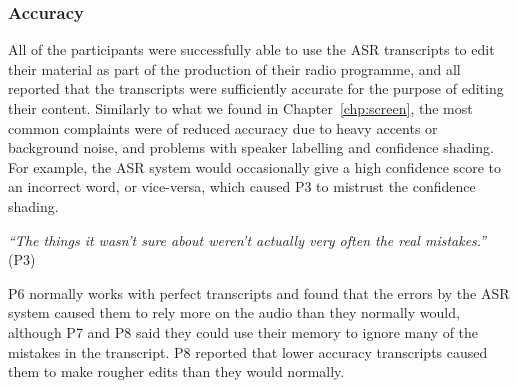 \subsubsection{Accuracy}

All of the participants were successfully able to use the ASR transcripts to edit their material as
part of the production of their radio programme, and all reported that the transcripts were sufficiently accurate for
the purpose of editing their content. Similarly to what we found in Chapter~\ref{chp:screen}, the most common
complaints were of reduced accuracy due to heavy accents or background noise, and problems with speaker labelling and
confidence shading. For example, the ASR system would occasionally give a high confidence score to an
incorrect word, or vice-versa, which caused P3 to mistrust the confidence shading.

\textit{``The things it wasn't sure about weren't actually very often the real mistakes.''} (P3)



P6 normally works with perfect transcripts and found that the errors by the ASR system caused them to rely more on
the audio than they normally would, although P7 and P8 said they could use their memory to ignore many of the mistakes
in the transcript.  P8 reported that lower accuracy transcripts caused them to make rougher edits than they would
normally.





